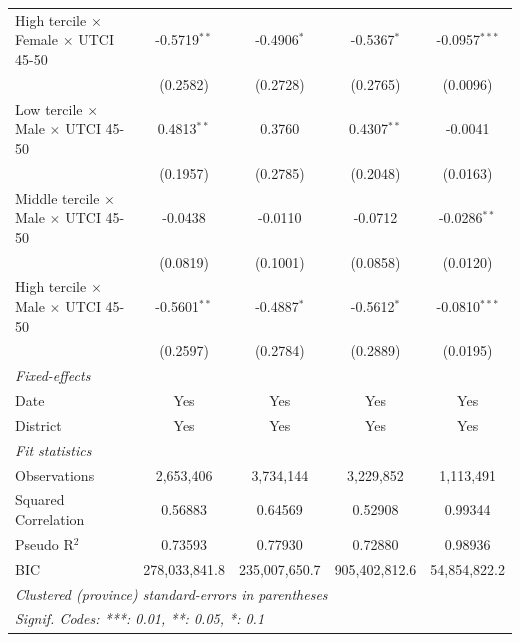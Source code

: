 \begin{table}[htbp]
\begin{tabular}{lcccc}
      High tercile $\times$ Female $\times$ UTCI 45-50     & -0.5719$^{**}$  & -0.4906$^{*}$       & -0.5367$^{*}$     & -0.0957$^{***}$\\   
                                                           & (0.2582)        & (0.2728)            & (0.2765)          & (0.0096)\\   
      Low tercile $\times$ Male $\times$ UTCI 45-50        & 0.4813$^{**}$   & 0.3760              & 0.4307$^{**}$     & -0.0041\\   
                                                           & (0.1957)        & (0.2785)            & (0.2048)          & (0.0163)\\   
      Middle tercile $\times$ Male $\times$ UTCI 45-50     & -0.0438         & -0.0110             & -0.0712           & -0.0286$^{**}$\\   
                                                           & (0.0819)        & (0.1001)            & (0.0858)          & (0.0120)\\   
      High tercile $\times$ Male $\times$ UTCI 45-50       & -0.5601$^{**}$  & -0.4887$^{*}$       & -0.5612$^{*}$     & -0.0810$^{***}$\\   
                                                           & (0.2597)        & (0.2784)            & (0.2889)          & (0.0195)\\   
      \midrule
      \emph{Fixed-effects}\\
      Date                                                 & Yes             & Yes                 & Yes               & Yes\\  
      District                                             & Yes             & Yes                 & Yes               & Yes\\  
      \midrule
      \emph{Fit statistics}\\
      Observations                                         & 2,653,406       & 3,734,144           & 3,229,852         & 1,113,491\\  
      Squared Correlation                                  & 0.56883         & 0.64569             & 0.52908           & 0.99344\\  
      Pseudo R$^2$                                         & 0.73593         & 0.77930             & 0.72880           & 0.98936\\  
      BIC                                                  & 278,033,841.8   & 235,007,650.7       & 905,402,812.6     & 54,854,822.2\\  
      \midrule \midrule
      \multicolumn{5}{l}{\emph{Clustered (province) standard-errors in parentheses}}\\
      \multicolumn{5}{l}{\emph{Signif. Codes: ***: 0.01, **: 0.05, *: 0.1}}\\
   \end{tabular}
\end{table}


